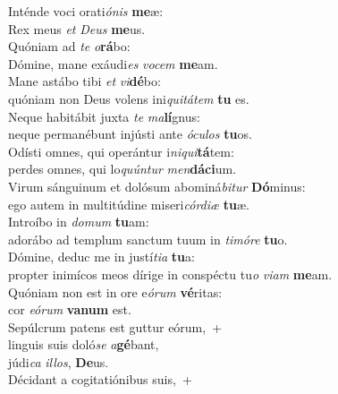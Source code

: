 \evenverse Inténde voci orati\textit{ó}\textit{nis} \textbf{me}æ:~\*\\
\evenverse Rex meus \textit{et} \textit{De}\textit{us} \textbf{me}us.\\
\oddverse Quóniam ad \textit{te} \textit{o}\textbf{rá}bo:~\*\\
\oddverse Dómine, mane exáudi\textit{es} \textit{vo}\textit{cem} \textbf{me}am.\\
\evenverse Mane astábo tibi \textit{et} \textit{vi}\textbf{dé}bo:~\*\\
\evenverse quóniam non Deus volens ini\textit{qui}\textit{tá}\textit{tem} \textbf{tu} es.\\
\oddverse Neque habitábit juxta \textit{te} \textit{ma}\textbf{lí}gnus:~\*\\
\oddverse neque permanébunt injústi ante \textit{ó}\textit{cu}\textit{los} \textbf{tu}os.\\
\evenverse Odísti omnes, qui operántur i\textit{ni}\textit{qui}\textbf{tá}tem:~\*\\
\evenverse perdes omnes, qui lo\textit{quún}\textit{tur} \textit{men}\textbf{dá}\textbf{ci}um.\\
\oddverse Virum sánguinum et dolósum abominá\textit{bi}\textit{tur} \textbf{Dó}minus:~\*\\
\oddverse ego autem in multitúdine miseri\textit{cór}\textit{di}\textit{æ} \textbf{tu}æ.\\
\evenverse Introíbo in \textit{do}\textit{mum} \textbf{tu}am:~\*\\
\evenverse adorábo ad templum sanctum tuum in \textit{ti}\textit{mó}\textit{re} \textbf{tu}o.\\
\oddverse Dómine, deduc me in justí\textit{ti}\textit{a} \textbf{tu}a:~\*\\
\oddverse propter inimícos meos dírige in conspéctu tu\textit{o} \textit{vi}\textit{am} \textbf{me}am.\\
\evenverse Quóniam non est in ore e\textit{ó}\textit{rum} \textbf{vé}ritas:~\*\\
\evenverse cor \textit{e}\textit{ó}\textit{rum} \textbf{va}\textbf{num} est.\\
\oddverse Sepúlcrum patens est guttur eórum,~+\\
\oddverse  linguis suis doló\textit{se} \textit{a}\textbf{gé}bant,~\*\\
\oddverse júdi\textit{ca} \textit{il}\textit{los}, \textbf{De}us.\\
\evenverse Décidant a cogitatiónibus suis,~+\\
